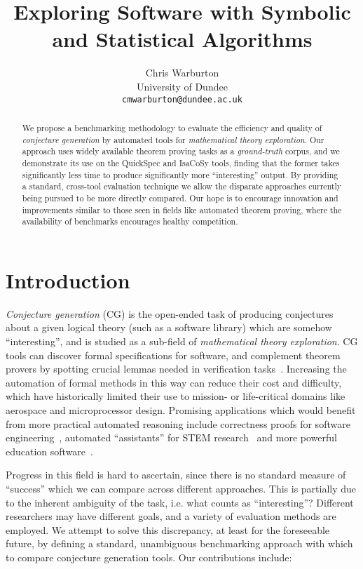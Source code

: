 \documentclass[]{default}
\title{Exploring Software with Symbolic and Statistical Algorithms}
\author{
          Chris Warburton \\
      University of Dundee \\
      \texttt{cmwarburton@dundee.ac.uk}
    }
\date{}
\begin{document}
\maketitle
\begin{abstract}
  We propose a benchmarking methodology to evaluate the efficiency and quality
  of \emph{conjecture generation} by automated tools for \emph{mathematical
    theory exploration}. Our approach uses widely available theorem proving
  tasks as a \emph{ground-truth} corpus, and we demonstrate its use on the
  QuickSpec and IsaCoSy tools, finding that the former takes significantly less
  time to produce significantly more ``interesting'' output. By providing a
  standard, cross-tool evaluation technique we allow the disparate approaches
  currently being pursued to be more directly compared. Our hope is to encourage
  innovation and improvements similar to those seen in fields like automated
  theorem proving, where the availability of benchmarks encourages healthy
  competition.
\end{abstract}

\section{Introduction}\label{introduction}

\emph{Conjecture generation} (CG) is the open-ended task of producing
conjectures about a given logical theory (such as a software library) which are
somehow ``interesting'', and is studied as a sub-field of \emph{mathematical
  theory exploration}. CG tools can discover formal specifications for software,
and complement theorem provers by spotting crucial lemmas needed in verification
tasks~\cite{Claessen.Johansson.Rosen.ea:2013}. Increasing the automation of
formal methods in this way can reduce their cost and difficulty, which have
historically limited their use to mission- or life-critical domains like
aerospace and microprocessor design. Promising applications which would benefit
from more practical automated reasoning include correctness proofs for software
engineering~\cite{McKinna:2006,chlipala2011certified,Xi2003}, automated
``assistants'' for STEM
research~\cite{McCarthy_Programs59,lenat:77,benzmuller1997omegamega} and more
powerful education software~\cite{conf/ijcai/TrybulecB85,hendriks2010teaching}.

Progress in this field is hard to ascertain, since there is no standard measure
of ``success'' which we can compare across different approaches. This is
partially due to the inherent ambiguity of the task, i.e. what counts as
``interesting''? Different researchers may have different goals, and a variety
of evaluation methods are employed. We attempt to solve this discrepancy, at
least for the foreseeable future, by defining a standard, unambiguous
benchmarking approach with which to compare conjecture generation tools. Our
contributions include:
\end{document}
